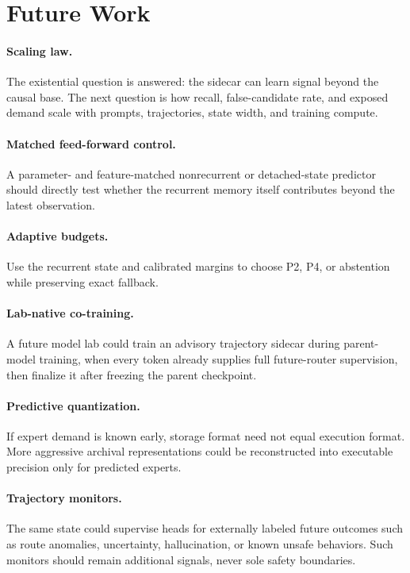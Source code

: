\documentclass[11pt]{article}
\begin{document}
\section{Future Work}

\paragraph{Scaling law.}
The existential question is answered: the sidecar can learn signal beyond the causal base. The next question is how recall, false-candidate rate, and exposed demand scale with prompts, trajectories, state width, and training compute.

\paragraph{Matched feed-forward control.}
A parameter- and feature-matched nonrecurrent or detached-state predictor should directly test whether the recurrent memory itself contributes beyond the latest observation.

\paragraph{Adaptive budgets.}
Use the recurrent state and calibrated margins to choose P2, P4, or abstention while preserving exact fallback.

\paragraph{Lab-native co-training.}
A future model lab could train an advisory trajectory sidecar during parent-model training, when every token already supplies full future-router supervision, then finalize it after freezing the parent checkpoint.

\paragraph{Predictive quantization.}
If expert demand is known early, storage format need not equal execution format. More aggressive archival representations could be reconstructed into executable precision only for predicted experts.

\paragraph{Trajectory monitors.}
The same state could supervise heads for externally labeled future outcomes such as route anomalies, uncertainty, hallucination, or known unsafe behaviors. Such monitors should remain additional signals, never sole safety boundaries.
\end{document}
